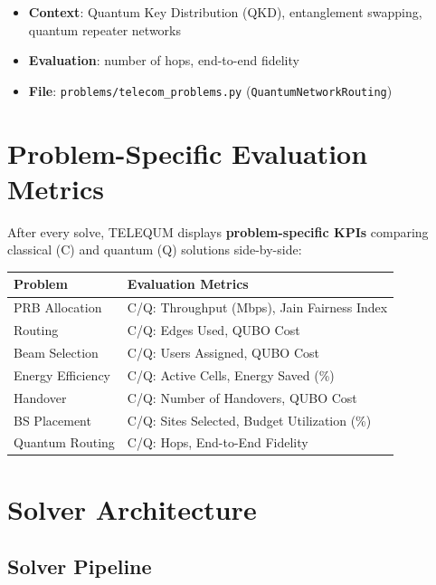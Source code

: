 \documentclass[11pt,a4paper]{article}
\begin{document}
\begin{itemize}
  \item \textbf{Context}: Quantum Key Distribution (QKD), entanglement swapping, quantum repeater networks
  \item \textbf{Evaluation}: number of hops, end-to-end fidelity
  \item \textbf{File}: \texttt{problems/telecom\_problems.py} (\texttt{QuantumNetworkRouting})
\end{itemize}


\section{Problem-Specific Evaluation Metrics}
\label{sec:eval}

After every solve, TELEQUM displays \textbf{problem-specific KPIs} comparing classical (C) and quantum (Q) solutions side-by-side:

\begin{center}
\begin{tabularx}{\textwidth}{lX}
  \toprule
  \textbf{Problem} & \textbf{Evaluation Metrics} \\
  \midrule
  PRB Allocation & C/Q: Throughput (Mbps), Jain Fairness Index \\
  Routing & C/Q: Edges Used, QUBO Cost \\
  Beam Selection & C/Q: Users Assigned, QUBO Cost \\
  Energy Efficiency & C/Q: Active Cells, Energy Saved (\%) \\
  Handover & C/Q: Number of Handovers, QUBO Cost \\
  BS Placement & C/Q: Sites Selected, Budget Utilization (\%) \\
  Quantum Routing & C/Q: Hops, End-to-End Fidelity \\
  \bottomrule
\end{tabularx}
\end{center}


\section{Solver Architecture}

\subsection{Solver Pipeline}
\end{document}
